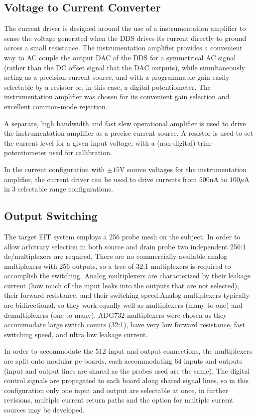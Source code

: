 \subsection{Voltage to Current Converter}

The current driver is designed around the use of a instrumentation amplifier to sense the voltage generated when the DDS drives its current directly to ground across a small resistance. The instrumentation amplifier provides a convenient way to AC couple the output DAC of the DDS for a symmetrical AC signal (rather than the DC offset signal that the DAC outputs), while simultaneously acting as a precision current source, and with a programmable gain easily selectable by a resistor or, in this case, a digital potentiometer. The instrumentation amplifier was chosen for its convenient gain selection and excellent common-mode rejection. 

A separate, high bandwidth and fast slew operational amplifier is used to drive the instrumentation amplifier as a precise current source. A resistor is used to set the current level for a given input voltage, with a (non-digital) trim-potentiometer used for callibration. 

In the current configuration with $\pm15$V source voltages for the instrumentation amplifier, the current driver can be used to drive currents from $500$nA to $100\mu$A in 3 selectable range configurations. 


\subsection{Output Switching}

The target EIT system employs a 256 probe mesh on the subject. In order to allow arbitrary selection in both source and drain probe  two independent 256:1 de/multiplexers are required, There are no commercially available analog multiplexers with 256 outputs, so a tree of 32:1 multiplexers is required to accomplish the switching. Analog multiplexers are characterized by their leakage current (how much of the input leaks into the outputs that are not selected), their forward resistance, and their switching speed.Analog multiplexers typically are bidirectional, so they work equally well as multiplexers (many to one) and demultiplexers (one to many).  ADG732 multiplexers were chosen as they accommodate large switch counts (32:1), have very low forward resistance, fast switching speed, and ultra low leakage current.

In order to accommodate the 512 input and output connections, the multiplexers are split onto modular pc-boards, each accommodating 64 inputs and outputs (input and output lines are shared as the probes used are the same). The digital control signals are propagated to each board along shared signal lines, so in this configuration only one input and output are selectable at once, in further revisions, multiple current return paths and the option for multiple current sources may be developed.



 






